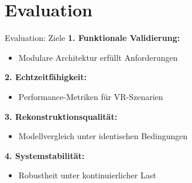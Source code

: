 \section{Evaluation}\sectionFrame

\begin{frame}{Evaluation: Ziele}{}
    \textbf{1. Funktionale Validierung:}
    \begin{itemize}
        \item Modulare Architektur erfüllt Anforderungen
    \end{itemize}
    \textbf{2. Echtzeitfähigkeit:}
    \begin{itemize}
        \item Performance-Metriken für VR-Szenarien
    \end{itemize}
    \textbf{3. Rekonstruktionsqualität:}
    \begin{itemize}
        \item Modellvergleich unter identischen Bedingungen
    \end{itemize}
    \textbf{4. Systemstabilität:}
    \begin{itemize}
        \item Robustheit unter kontinuierlicher Last
    \end{itemize}
\end{frame}

